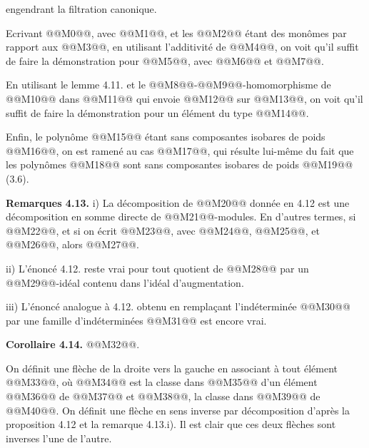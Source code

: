 
engendrant la filtration canonique.

Ecrivant @@M0@@, avec @@M1@@, et les @@M2@@ étant des monômes par rapport aux @@M3@@, en utilisant l'additivité de @@M4@@, on voit qu'il suffit de faire la démonstration pour @@M5@@, avec @@M6@@ et @@M7@@.

En utilisant le lemme 4.11. et le @@M8@@-@@M9@@-homomorphisme de @@M10@@ dans @@M11@@ qui envoie @@M12@@ sur @@M13@@, on voit qu'il suffit de faire la démonstration pour un élément du type @@M14@@.

Enfin, le polynôme @@M15@@ étant sans composantes isobares de poids @@M16@@, on est ramené au cas @@M17@@, qui résulte lui-même du fait que les polynômes @@M18@@ sont sans composantes isobares de poids @@M19@@ (3.6).

\textbf{Remarques 4.13.} i) La décomposition de @@M20@@ donnée en 4.12 est une décomposition en somme directe de @@M21@@-modules. En d'autres termes, si @@M22@@, et si on écrit @@M23@@, avec @@M24@@, @@M25@@, et @@M26@@, alors @@M27@@.

ii) L'énoncé 4.12. reste vrai pour tout quotient de @@M28@@ par un @@M29@@-idéal contenu dans l'idéal d'augmentation.

iii) L'énoncé analogue à 4.12. obtenu en remplaçant l'indéterminée @@M30@@ par une famille d'indéterminées @@M31@@ est encore vrai.

\textbf{Corollaire 4.14.} @@M32@@.

On définit une flèche de la droite vers la gauche en associant à tout élément @@M33@@, où @@M34@@ est la classe dans @@M35@@ d'un élément @@M36@@ de @@M37@@ et @@M38@@, la classe dans @@M39@@ de @@M40@@. On définit une flèche en sens inverse par décomposition d'après la proposition 4.12 et la remarque 4.13.i). Il est clair que ces deux flèches sont inverses l'une de l'autre.

